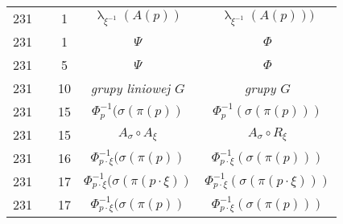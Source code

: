 \documentclass[a4paper,11pt]{article}
\numberwithin{equation}{section}
\renewcommand{\lambda}{\uplambda}
\begin{document}
\begin{center}
\begin{tabular}{|c|c|c|c|c|}
    231 & & \hphantom{0}1 & $\lambda_{ \xi^{ -1 } }( A( p ) )$
    & $\lambda_{ \xi^{ -1 } }( A( p ) ) )$ \\
    231 & & \hphantom{0}1 & $\Psi$ & $\Phi$ \\
    231 & & \hphantom{0}5 & $\Psi$ & $\Phi$ \\
    231 & & 10 & \textit{grupy liniowej $G$} & \textit{grupy $G$} \\
    231 & & 15 & $\Phi^{ -1 }_{ p }( \sigma( \pi( p ) )$
           & $\Phi^{ -1 }_{ p }( \sigma( \pi( p ) ) )$ \\
    231 & & 15 & $A_{ \sigma } \circ A_{ \xi }$ & $A_{ \sigma } \circ R_{ \xi }$ \\
    231 & & 16 & $\Phi^{ -1 }_{ p \cdot \xi }( \sigma( \pi( p ) )$
           & $\Phi^{ -1 }_{ p \cdot \xi }( \sigma( \pi( p ) ) )$ \\
    231 & & 17 & $\Phi^{ -1 }_{ p \cdot \xi }( \sigma( \pi( p \cdot \xi ) )$
           & $\Phi^{ -1 }_{ p \cdot \xi }( \sigma( \pi( p \cdot \xi ) ) )$ \\
    231 & & 17 & $\Phi^{ -1 }_{ p \cdot \xi }( \sigma( \pi( p ) )$
           & $\Phi^{ -1 }_{ p \cdot \xi }( \sigma( \pi( p ) ) )$ \\
    \hline
  \end{tabular}





  \newpage


\end{center}
\end{document}
